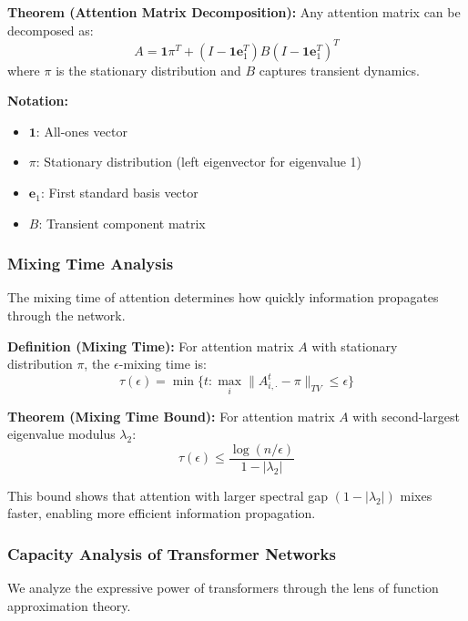\documentclass[11pt]{article}
\begin{document}
\textbf{Theorem (Attention Matrix Decomposition):} Any attention matrix can be decomposed as:
\begin{equation}
A = \mathbf{1}\pi^T + (I - \mathbf{1}\mathbf{e}_1^T)B(I - \mathbf{1}\mathbf{e}_1^T)^T
\end{equation}
where $\pi$ is the stationary distribution and $B$ captures transient dynamics.

\begin{notationbox}
\textbf{Notation:}
\begin{itemize}
    \item $\mathbf{1}$: All-ones vector
    \item $\pi$: Stationary distribution (left eigenvector for eigenvalue 1)
    \item $\mathbf{e}_1$: First standard basis vector
    \item $B$: Transient component matrix
\end{itemize}
\end{notationbox}

\subsubsection{Mixing Time Analysis}

The mixing time of attention determines how quickly information propagates through the network.

\textbf{Definition (Mixing Time):} For attention matrix $A$ with stationary distribution $\pi$, the $\epsilon$-mixing time is:
\begin{equation}
\tau(\epsilon) = \min\{t : \max_{i} \|A^t_{i,\cdot} - \pi\|_{TV} \leq \epsilon\}
\end{equation}

\textbf{Theorem (Mixing Time Bound):} For attention matrix $A$ with second-largest eigenvalue modulus $\lambda_2$:
\begin{equation}
\tau(\epsilon) \leq \frac{\log(n/\epsilon)}{1 - |\lambda_2|}
\end{equation}

This bound shows that attention with larger spectral gap $(1 - |\lambda_2|)$ mixes faster, enabling more efficient information propagation.

\subsubsection{Capacity Analysis of Transformer Networks}

We analyze the expressive power of transformers through the lens of function approximation theory.
\end{document}
